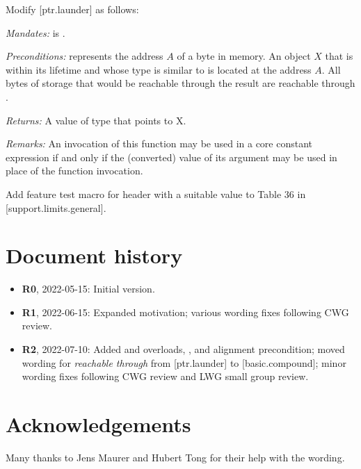 Modify [ptr.launder] as follows:

\begin{adjustwidth}{0.5cm}{0.5cm}

  \emph{Mandates:}  is .

  \emph{Preconditions:}  represents the address $A$ of a byte in memory. An object $X$ that is within its lifetime and whose type is similar to  is located at the address $A$. All bytes of storage that would be reachable through  the result are reachable through  .

  \emph{Returns:} A value of type  that points to {X}.

  \emph{Remarks:} An invocation of this function may be used in a core constant expression if and only if the (converted) value of its argument may be used in place of the function invocation. 
\end{adjustwidth}

Add feature test macro
 for header  with a suitable value to
Table 36 in [support.limits.general].


\section*{Document history}

\begin{itemize}
\item \textbf{R0}, 2022-05-15: Initial version.
\item \textbf{R1}, 2022-06-15: Expanded motivation; various wording fixes following CWG review.
\item \textbf{R2}, 2022-07-10: Added  and  overloads, , and alignment precondition; moved wording for \emph{reachable through} from [ptr.launder] to [basic.compound]; minor wording fixes following CWG review and LWG small group review.
\end{itemize}


\section*{Acknowledgements}

Many thanks to Jens Maurer and Hubert Tong for their help with the wording.


\renewcommand{\bibname}{References}



